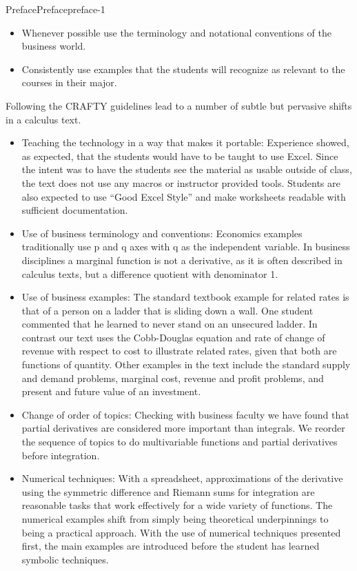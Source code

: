 \documentclass[oneside,10pt,]{book}
\numberwithin{equation}{section}
\begin{document}
\begin{preface}{Preface}{}{Preface}{}{}{preface-1}
\begin{itemize}[label=\textbullet]
\item{}\hypertarget{p-15}{}%
Whenever possible use the terminology and notational conventions of the business world.%
\item{}\hypertarget{p-16}{}%
Consistently use examples that the students will recognize as relevant to the courses in their major.%
\end{itemize}
\hypertarget{p-17}{}%
Following the CRAFTY guidelines lead to a number of subtle but pervasive shifts in a calculus text.%
\leavevmode%
\begin{itemize}[label=\textbullet]
\item{}\hypertarget{p-18}{}%
Teaching the technology in a way that makes it portable: Experience showed, as expected, that the students would have to be taught to use Excel. Since the intent was to have the students see the material as usable outside of class, the text does not use any macros or instructor provided tools. Students are also expected to use “Good Excel Style” and make worksheets readable with sufficient documentation.%
\item{}\hypertarget{p-19}{}%
Use of business terminology and conventions: Economics examples traditionally use p and q axes with q as the independent variable. In business disciplines a marginal function is not a derivative, as it is often described in calculus texts, but a difference quotient with denominator 1.%
\item{}\hypertarget{p-20}{}%
Use of business examples: The standard textbook example for related rates is that of a person on a ladder that is sliding down a wall. One student commented that he learned to never stand on an unsecured ladder. In contrast our text uses the Cobb-Douglas equation and rate of change of revenue with respect to cost to illustrate related rates, given that both are functions of quantity. Other examples in the text include the standard supply and demand problems, marginal cost, revenue and profit problems, and present and future value of an investment.%
\item{}\hypertarget{p-21}{}%
Change of order of topics: Checking with business faculty we have found that partial derivatives are considered more important than integrals. We reorder the sequence of topics to do multivariable functions and partial derivatives before integration.%
\item{}\hypertarget{p-22}{}%
Numerical techniques: With a spreadsheet, approximations of the derivative using the symmetric difference and Riemann sums for integration are reasonable tasks that work effectively for a wide variety of functions. The numerical examples shift from simply being theoretical underpinnings to being a practical approach. With the use of numerical techniques presented first, the main examples are introduced before the student has learned symbolic techniques.%

\end{itemize}
\end{preface}
\end{document}
